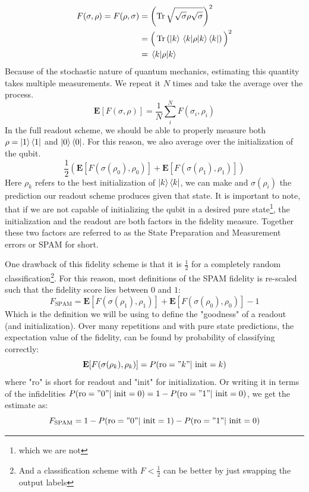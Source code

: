\begin{align*}
    F(\sigma, \rho) = F(\rho, \sigma) &= \left(\Tr\sqrt{\sqrt{\sigma} \rho \sqrt{\sigma}}\right)^2 \\
    &= \Big(\Tr \left(\ket{k}\mel{k}{\rho}{k}\bra{k}\right)\Big)^2\\
    &= \mel{k}{\rho}{k}
\end{align*}
Because of the stochastic nature of quantum mechanics, estimating this quantity takes multiple measurements. We repeat it $N$ times and take the average over the process.  
\begin{equation}
    \mathbf{E}\left[F(\sigma, \rho)\right] = \frac{1}{N}\sum_i^N F(\sigma_i, \rho_i)
\end{equation}
In the full readout scheme, we should be able to properly measure both $\rho = \ket{1}\bra{1}$ and $\ket{0}\bra{0}$. For this reason, we also average over the initialization of the qubit. 
\begin{equation}
     \frac12 \left(\mathbf{E}\left[F(\sigma(\rho_0), \rho_0)\right] +  \mathbf{E}\left[F(\sigma(\rho_1), \rho_1)\right]\right)
\end{equation}
Here $\rho_k$ refers to the best initialization of $\ket{k}\bra{k}$, we can make and $\sigma(\rho_i)$ the prediction our readout scheme produces given that state. It is important to note, that if we are not capable of initializing the qubit in a desired pure state\footnote{which we are not}, the initialization and the readout are both factors in  the fidelity measure. Together these two factors are referred to as the State Preparation and Measurement errors or SPAM for short.

One drawback of this fidelity scheme is that it is $\frac12$ for a completely random classification\footnote{And a classification scheme with $F<\frac12$ can be better by just swapping the output labels}. For this reason, most definitions of the SPAM fidelity \cite{gambetta_protocols_2007, blais_circuit_2021} is re-scaled such that the fidelity score lies between $0$ and $1$:
\begin{equation}
    F_{\text{SPAM}} = \mathbf{E}[F(\sigma(\rho_1), \rho_1)] + \mathbf{E}[F(\sigma(\rho_0), \rho_0)] - 1
\end{equation}
Which is the definition we will be using to define the "goodness" of a readout (and initialization). Over many repetitions and with pure state predictions, the expectation value of the fidelity, can be found by probability of classifying correctly:
\begin{equation}
     \mathbf{E}[F(\sigma(\rho_k), \rho_k)] = P(\text{ro} = "k"| \text{ init} = k)
\end{equation}
where "ro" is short for readout and "init" for initialization. Or writing it in terms of the infidelities $ P(\text{ro} = "0"| \text{ init} = 0) = 1 - P(\text{ro} = "1"| \text{ init} = 0)$, we get the estimate as:
\begin{equation}\label{eq:fidelity_spam_estimate}
    F_{\text{SPAM}} = 1 - P(\text{ro} = "0"| \text{ init} = 1) - P(\text{ro} = "1"| \text{ init} = 0)  
\end{equation}




